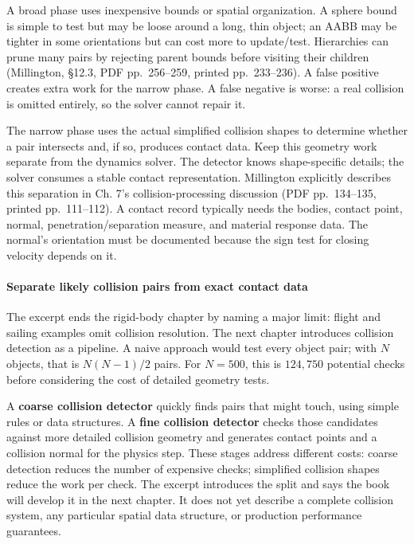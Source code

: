 A broad phase uses inexpensive bounds or spatial organization. A sphere bound is simple to test but may be loose around a long, thin object; an AABB may be tighter in some orientations but can cost more to update/test. Hierarchies can prune many pairs by rejecting parent bounds before visiting their children (Millington, §12.3, PDF pp.~256--259, printed pp.~233--236). A false positive creates extra work for the narrow phase. A false negative is worse: a real collision is omitted entirely, so the solver cannot repair it.

The narrow phase uses the actual simplified collision shapes to determine whether a pair intersects and, if so, produces contact data. Keep this geometry work separate from the dynamics solver. The detector knows shape-specific details; the solver consumes a stable contact representation. Millington explicitly describes this separation in Ch. 7's collision-processing discussion (PDF pp.~134--135, printed pp.~111--112). A contact record typically needs the bodies, contact point, normal, penetration/separation measure, and material response data. The normal's orientation must be documented because the sign test for closing velocity depends on it.

\paragraph{Separate likely collision pairs from exact contact data}\label{06-engine-ii-ch033-separate-likely-collision-pairs-from-exact-contact-data}

The excerpt ends the rigid-body chapter by naming a major limit: flight and sailing examples omit collision resolution. The next chapter introduces collision detection as a pipeline. A naive approach would test every object pair; with \(N\) objects, that is \(N(N-1)/2\) pairs. For \(N=500\), this is \(124{,}750\) potential checks before considering the cost of detailed geometry tests.

A \textbf{coarse collision detector} quickly finds pairs that might touch, using simple rules or data structures. A \textbf{fine collision detector} checks those candidates against more detailed collision geometry and generates contact points and a collision normal for the physics step. These stages address different costs: coarse detection reduces the number of expensive checks; simplified collision shapes reduce the work per check. The excerpt introduces the split and says the book will develop it in the next chapter. It does not yet describe a complete collision system, any particular spatial data structure, or production performance guarantees.

